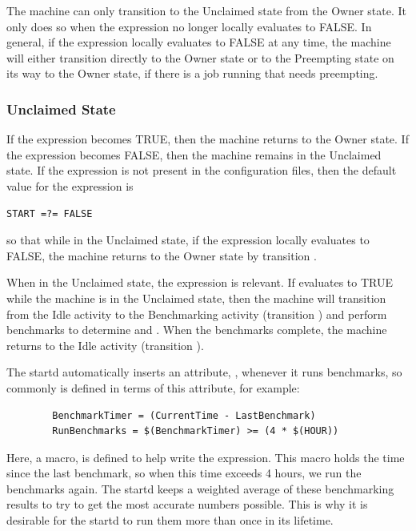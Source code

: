The machine can only transition to the Unclaimed state from the Owner state.
It only does so when the  expression no longer locally
evaluates to FALSE.
In general, if the 
expression locally evaluates to FALSE at any time,
the machine will either transition directly to the Owner state
or to the Preempting state on its way to the Owner state,
if there is a job running that needs preempting.

\subsubsection{\label{sec:Unclaimed-State}Unclaimed State}

If the  expression becomes TRUE, then the machine returns
to the Owner state.
If the  expression becomes FALSE, then the machine remains
in the Unclaimed state.
If the  expression is not present in the configuration files,
then the default value for the  expression is 
\begin{verbatim}
START =?= FALSE
\end{verbatim}
so that
while in the Unclaimed state, if the  expression locally
evaluates to FALSE, the machine returns to the Owner state by
transition .

When in the Unclaimed state,
the  \label{param:RunBenchmarks}  
expression is relevant.
If  evaluates to TRUE while the machine
is in the Unclaimed state,
then the machine will transition from the Idle
activity to the Benchmarking activity (transition ) and
perform benchmarks to determine  and .  
When the benchmarks complete, the machine returns to the Idle activity
(transition ).

The startd automatically inserts an attribute, ,
whenever it runs benchmarks, so commonly  is
defined in terms of this attribute, for example:
\begin{verbatim}
        BenchmarkTimer = (CurrentTime - LastBenchmark)
        RunBenchmarks = $(BenchmarkTimer) >= (4 * $(HOUR))
\end{verbatim}
Here, a macro,  is defined to help write the
expression.
This macro holds the time since the last benchmark,
so when this time exceeds 4 hours, we run the benchmarks again.
The startd keeps a weighted average of these benchmarking
results to try to get the most accurate numbers possible.
This is why
it is desirable for 
the startd to run them more than once in its lifetime.

